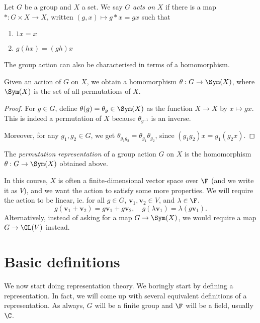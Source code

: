 \documentclass[a4paper]{article}
\begin{document}
\begin{defi}
  Let $G$ be a group and $X$ a set. We say $G$ \emph{acts on} $X$ if there is a map $*: G \times X \to X$, written $(g, x) \mapsto g * x = gx$ such that
  \begin{enumerate}
    \item $1x = x$
    \item $g(hx) = (gh)x$
  \end{enumerate}
\end{defi}

The group action can also be characterised in terms of a homomorphism.
\begin{lemma}
  Given an action of $G$ on $X$, we obtain a homomorphism $\theta: G \to \Sym(X)$, where $\Sym(X)$ is the set of all permutations of $X$.
\end{lemma}

\begin{proof}
  For $g \in G$, define $\theta(g) = \theta_g \in \Sym (X)$ as the function $X \to X$ by $x \mapsto gx$. This is indeed a permutation of $X$ because $\theta_{g^{-1}}$ is an inverse.

  Moreover, for any $g_1, g_2 \in G$, we get $\theta_{g_1g_2} = \theta_{g_1} \theta_{g_2}$, since $(g_1g_2) x = g_1(g_2x)$.
\end{proof}

\begin{defi}
  The \emph{permutation representation} of a group action $G$ on $X$ is the homomorphism $\theta: G \to \Sym (X)$ obtained above.
\end{defi}

In this course, $X$ is often a finite-dimensional vector space over $\F$ (and we write it as $V$), and we want the action to satisfy some more properties. We will require the action to be linear, ie. for all $g \in G$, $\mathbf{v}_1, \mathbf{v}_2 \in V$, and $\lambda \in \F$.
\[
  g(\mathbf{v}_1 + \mathbf{v}_2) = g \mathbf{v}_1 + g \mathbf{v}_2,\quad g(\lambda \mathbf{v}_1) = \lambda (g\mathbf{v}_1).
\]
Alternatively, instead of asking for a map $G \to \Sym(X)$, we would require a map $G \to \GL(V)$ instead.

\section{Basic definitions}
We now start doing representation theory. We boringly start by defining a representation. In fact, we will come up with several equivalent definitions of a representation. As always, $G$ will be a finite group and $\F$ will be a field, usually $\C$.
\end{document}
